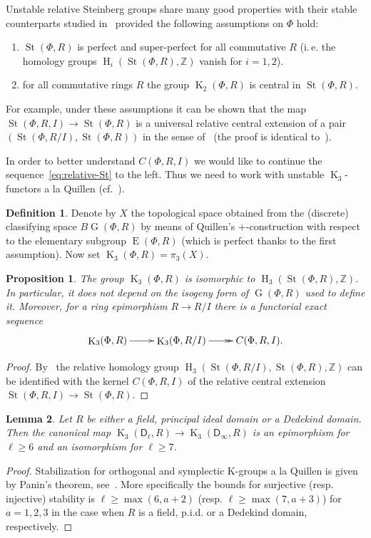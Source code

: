 \documentclass[oneside, 10pt]{amsart}
\newtheorem{prop}{Proposition}
\newtheorem{lemma}{Lemma}
\theoremstyle{remark}
\theoremstyle{definition}
\newtheorem{df}[lemma]{Definition} \Crefname{df}{Definition}{Definitions}
\DeclareMathOperator{\St}{St}
\DeclareMathOperator{\G}{G}
\DeclareMathOperator{\E}{E}
\DeclareMathOperator{\HH}{H}
\DeclareMathOperator{\K}{K}
\newcommand{\ZZ}{\mathbb{Z}}
\newcommand{\rD}{\mathsf{D}}
\numberwithin{equation}{section}
\begin{document}
Unstable relative Steinberg groups share many good properties with their stable counterparts studied in~\cite{Lo78} provided the following assumptions on $\Phi$ hold: \begin{enumerate}
 \item $\St(\Phi, R)$ is perfect and super-perfect for all commutative $R$ (i.\,e. the homology groups $\HH_i(\St(\Phi, R), \ZZ)$ vanish for $i=1,2$).
 \item for all commutative rings $R$ the group $\K_2(\Phi, R)$ is central in $\St(\Phi, R)$.
\end{enumerate}
For example, under these assumptions it can be shown that the map $\St(\Phi, R, I) \to \St(\Phi, R)$ is a universal relative central extension of a pair $(\St(\Phi, R/I), \St(\Phi, R))$ in the sense of~\cite{Lo78} (the proof is identical to~\cite[Corollary~3]{S15}).

In order to better understand $C(\Phi, R, I)$  we would like to continue the sequence~\eqref{eq:relative-St} to the left. Thus we need to work with unstable $\K_3$-functors a la Quillen (cf.~\cite{Pa89}).
\begin{df}  
Denote by $X$ the topological space obtained from the (discrete) classifying space $B\G(\Phi, R)$ by means of Quillen's $+$-construction with respect to the elementary subgroup $\E(\Phi, R)$ (which is perfect thanks to the first assumption). Now set $\K_3(\Phi, R) = \pi_3(X)$. \end{df}

\begin{prop}\label{characterization} The group $\K_3(\Phi, R)$ is isomorphic to $\HH_3(\St(\Phi, R), \ZZ)$. In particular, it does not depend on the isogeny form of $\G(\Phi, R)$ used to define it. Moreover, for a ring epimorphism $R \to R/I$ there is a functorial exact sequence
\[ \xymatrix{\K_3(\Phi, R) \ar[r] & \K_3(\Phi, R/I) \ar@{->>}[r] & C(\Phi, R, I).} \]
\end{prop}
\begin{proof}
 
 By~\cite[Th{\'e}or{\`e}me~2]{Lo78} the relative homology group $\HH_3(\St(\Phi, R/I), \St(\Phi, R), \ZZ)$ can be identified with the kernel $C(\Phi, R, I)$ of the relative central extension $\St(\Phi, R, I) \to \St(\Phi, R)$.
\end{proof}


\begin{lemma} \label{lem:Panin-stability}
 Let $R$ be either a field, principal ideal domain or a Dedekind domain. 
 Then the canonical map $\K_3(\rD_\ell, R) \to \K_3(\rD_\infty, R)$ is an epimorphism for $\ell \geq 6$ 
 and an isomorphism for $\ell \geq 7$.
\end{lemma}
\begin{proof}
 Stabilization for orthogonal and symplectic K-groups a la Quillen is given by Panin's theorem, see~\cite[Theorem~9.4]{Pa89}. More specifically the bounds for surjective (resp. injective) stability is 
 $\ell \geq \max(6, a+2)$ (resp. $\ell \geq \max(7,a+3)$) for $a=1,2,3$ in the case when $R$ is a field, p.i.d. or a Dedekind domain, respectively.
\end{proof}
\end{document}
